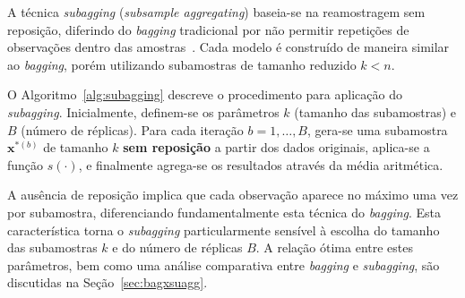 A técnica \textit{subagging} (\textit{subsample aggregating}) baseia-se na reamostragem sem reposição, diferindo do \textit{bagging} tradicional por não permitir repetições de observações dentro das amostras~\cite{GALVAO:2006,Buhlmann2003,revelas2024,qin2023,zhaoY2018,shi2021,zhang2017,Tao2021,paleologo2020,wei2021}. Cada modelo é construído de maneira similar ao \textit{bagging}, porém utilizando subamostras de tamanho reduzido $k < n$.

\begin{center}
\begin{minipage}{0.85\textwidth}
\centering %
\end{minipage}
\end{center}

\medskip

O Algoritmo~\ref{alg:subagging} descreve o procedimento para aplicação do \textit{subagging}. Inicialmente, definem-se os parâmetros $k$ (tamanho das subamostras) e $B$ (número de réplicas). Para cada iteração $b = 1, \ldots, B$, gera-se uma subamostra $\mathbf{x}^{*(b)}$ de tamanho $k$ \textbf{sem reposição} a partir dos dados originais, aplica-se a função $s(\cdot)$, e finalmente agrega-se os resultados através da média aritmética.

A ausência de reposição implica que cada observação aparece no máximo uma vez por subamostra, diferenciando fundamentalmente esta técnica do \textit{bagging}. Esta característica torna o \textit{subagging} particularmente sensível à escolha do tamanho das subamostras $k$ e do número de réplicas $B$. A relação ótima entre estes parâmetros, bem como uma análise comparativa entre \textit{bagging} e \textit{subagging}, são discutidas na Seção~\ref{sec:bagxsuagg}.

